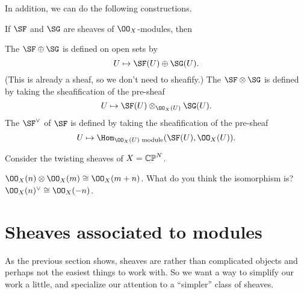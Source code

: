 \documentclass[11pt]{scrreprt}
\begin{document}
In addition, we can do the following constructions.
\begin{definition}
	If $\SF$ and $\SG$ are sheaves of $\OO_X$-modules, then
	\begin{enumerate}[(a)]
		\ii The  $\SF \oplus \SG$ is defined
		on open sets by \[ U \mapsto \SF(U) \oplus \SG(U). \]
		(This is already a sheaf, so we don't need to sheafify.)
		\ii The  $\SF \otimes \SG$ is defined
		by taking the sheafification of the pre-sheaf
		\[ U \mapsto \SF(U) \otimes_{\OO_X(U)} \SG(U). \]
		\ii The  $\SF^\vee$ of $\SF$ is defined
		by taking the sheafification of the pre-sheaf
		\[ U \mapsto \Hom_{\OO_X(U) \text{ module}} (\SF(U), \OO_X(U)). \]
	\end{enumerate}
\end{definition}
\begin{example}
	Consider the twisting sheaves of $X = \mathbb{CP}^N$.
	\begin{enumerate}[(a)]
		\ii $\OO_X(n) \otimes \OO_X(m) \cong \OO_X(m+n)$.
		What do you think the isomorphism is?
		\ii $\OO_X(n)^\vee \cong \OO_X(-n)$.
	\end{enumerate}
\end{example}

\section{Sheaves associated to modules}
As the previous section shows, sheaves are rather than complicated objects
and perhaps not the easiest things to work with.
So we want a way to simplify our work a little,
and specialize our attention to a ``simpler'' class of sheaves.
\end{document}
